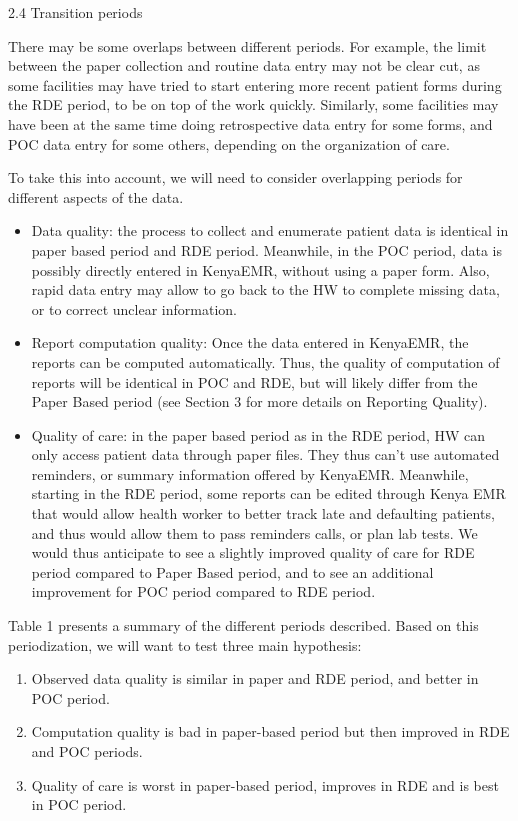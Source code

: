 \documentclass[a4paper,11pt,final,twoside]{article}
\begin{document}
2.4	Transition periods

There may be some overlaps between different periods. For example, the limit between the paper collection and routine data entry may not be clear cut, as some facilities may have tried to start entering more recent patient forms during the RDE period, to be on top of the work quickly. Similarly, some facilities may have been at the same time doing retrospective data entry for some forms, and POC data entry for some others, depending on the organization of care.

To take this into account, we will need to consider overlapping periods for different aspects of the data.
\begin{itemize}
\item	Data quality: the process to collect and enumerate patient data is identical in paper based period and RDE period. Meanwhile, in the POC period, data is possibly directly entered in KenyaEMR, without using a paper form. Also, rapid data entry may allow to go back to the HW to complete missing data, or to correct unclear information.
\item	Report computation quality: Once the data entered in KenyaEMR, the reports can be computed automatically. Thus, the quality of computation of reports will be identical in POC and RDE, but will likely differ from the Paper Based period (see Section 3 for more details on Reporting Quality).
\item	Quality of care: in the paper based period as in the RDE period, HW can only access patient data through paper files. They thus can’t use automated reminders, or summary information offered by KenyaEMR. Meanwhile, starting in the RDE period, some reports can be edited through Kenya EMR that would allow health worker to better track late and defaulting patients, and thus would allow them to pass reminders calls, or plan lab tests. We would thus anticipate to see a slightly improved quality of care for RDE period compared to Paper Based period, and to see an additional improvement for POC period compared to RDE period.
\end{itemize}

Table 1 presents a summary of the different periods described. Based on this periodization, we will want to test three main hypothesis:
\begin{enumerate}
\item	Observed data quality is similar in paper and RDE period, and better in POC period.
\item	Computation quality is bad in paper-based period but then improved in RDE and POC periods.
\item	Quality of care is worst in paper-based period, improves in RDE and is best in POC period.
\end{enumerate}
\end{document}
